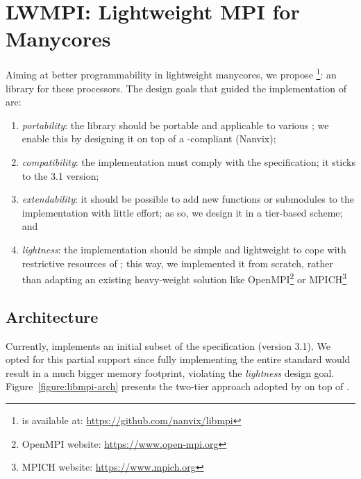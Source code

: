 \section{LWMPI: Lightweight MPI for Manycores}
\label{sec:proposal}

	Aiming at better programmability in lightweight manycores,
	we propose \lwmpi\footnote{\lwmpi is available at:
	\url{https://github.com/nanvix/libmpi}}: an \mpi library for these
	processors.
	The design goals that guided the implementation of \lwmpi are:
	\begin{enumerate}[label=(\roman*)]
		\item \textit{portability}: the library should be portable and
			applicable to various \lws; we enable this by designing it
			on top of a \posix-compliant \os (Nanvix);

		\item \textit{compatibility}: the implementation
			must comply with the \mpi specification; it sticks to the
			3.1 version;

		\item \textit{extendability}: it should be possible to add new
			functions or submodules to the implementation with little
			effort; as so, we design it in a tier-based scheme; and

		\item \textit{lightness}: the implementation should be simple and
			lightweight to cope with restrictive resources of \lws; this way,
			we implemented it from scratch, rather than adapting an existing
			heavy-weight solution like
			OpenMPI\footnote{OpenMPI website: \url{https://www.open-mpi.org}} or
			MPICH\footnote{MPICH website: \url{https://www.mpich.org}}
	\end{enumerate}


\subsection{\lwmpi Architecture}
\label{sec:libmpi-impl}

	Currently, \lwmpi implements an initial subset of the \mpi
	specification (version 3.1). We opted for this partial support since
	fully implementing the entire standard would result in a much bigger
	memory footprint, violating the \textit{lightness} design goal.
	Figure~\ref{figure:libmpi-arch} presents the two-tier approach
	adopted by \lwmpi on top of \nanvix.

